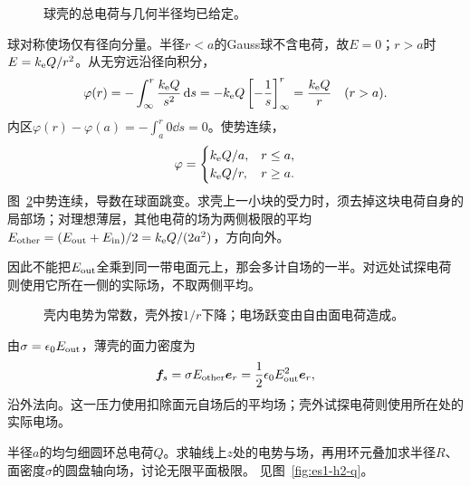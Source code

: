 \begin{figure}[H]\centering
{}
\caption{球壳的总电荷与几何半径均已给定。}\label{fig:es1-h1-q}
\end{figure}
\begin{solution}
球对称使场仅有径向分量。半径$r<a$的Gauss球不含电荷，故$E=0$；$r>a$时$E=k_{\rm e} Q/r^2$。从无穷远沿径向积分，
\[\varphi(r)=-\int_\infty^r\frac{k_{\rm e} Q}{s^2}\mathop{}\!\mathrm d s
=-k_{\rm e} Q\left[-\frac1s\right]_\infty^r=\frac{k_{\rm e} Q}{r}\quad(r>a).\]
内区$\varphi(r)-\varphi(a)=-\int_a^r0\dd s=0$。使势连续，
\[\varphi=\begin{cases}k_{\rm e} Q/a,&r\le a,\\k_{\rm e} Q/r,&r\ge a.\end{cases}\]
图~\ref{fig:es1-h1-s}中势连续，导数在球面跳变。求壳上一小块的受力时，须去掉这块电荷自身的局部场；对理想薄层，其他电荷的场为两侧极限的平均$E_{\rm other}=(E_{\rm out}+E_{\rm in})/2=k_{\rm e} Q/(2a^2)$，方向向外。

因此不能把$E_{\rm out}$全乘到同一带电面元上，那会多计自场的一半。对远处试探电荷则使用它所在一侧的实际场，不取两侧平均。
\begin{figure}[H]\centering
{}
\caption{壳内电势为常数，壳外按$1/r$下降；电场跃变由自由面电荷造成。}\label{fig:es1-h1-s}
\end{figure}


由$\sigma=\epsilon_0E_{\rm out}$，薄壳的面力密度为
\[\bm{f}_s=\sigma E_{\rm other}\bm{e}_r
=\frac12\epsilon_0E_{\rm out}^2\bm{e}_r,\]
沿外法向。这一压力使用扣除面元自场后的平均场；壳外试探电荷则使用所在处的实际电场。
\end{solution}

\begin{exercise}[从环轴到平面]\label{ex:es1-h2}
半径$a$的均匀细圆环总电荷$Q$。求轴线上$z$处的电势与场，再用环元叠加求半径$R$、面密度$\sigma$的圆盘轴向场，讨论无限平面极限。 见图~\ref{fig:es1-h2-q}。
\end{exercise}

